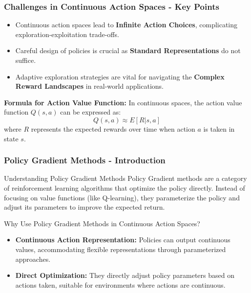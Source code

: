 \documentclass[aspectratio=169]{beamer}
\begin{document}
\begin{frame}[fragile]
    \frametitle{Challenges in Continuous Action Spaces - Key Points}
    \begin{itemize}
        \item Continuous action spaces lead to \textbf{Infinite Action Choices}, complicating exploration-exploitation trade-offs.
        \item Careful design of policies is crucial as \textbf{Standard Representations} do not suffice.
        \item Adaptive exploration strategies are vital for navigating the \textbf{Complex Reward Landscapes} in real-world applications.
    \end{itemize}
    
    \textbf{Formula for Action Value Function:}
    In continuous spaces, the action value function \( Q(s, a) \) can be expressed as:
    \begin{equation}
        Q(s, a) \approx E[R | s, a]
    \end{equation}
    where \( R \) represents the expected rewards over time when action \( a \) is taken in state \( s \).
\end{frame}

\begin{frame}[fragile]
    \frametitle{Policy Gradient Methods - Introduction}
    \begin{block}{Understanding Policy Gradient Methods}
        Policy Gradient methods are a category of reinforcement learning algorithms that optimize the policy directly. Instead of focusing on value functions (like Q-learning), they parameterize the policy and adjust its parameters to improve the expected return.
    \end{block}
    
    \begin{block}{Why Use Policy Gradient Methods in Continuous Action Spaces?}
        \begin{itemize}
            \item \textbf{Continuous Action Representation:} Policies can output continuous values, accommodating flexible representations through parameterized approaches.
            \item \textbf{Direct Optimization:} They directly adjust policy parameters based on actions taken, suitable for environments where actions are continuous.
        \end{itemize}
    \end{block}
\end{frame}
\end{document}
